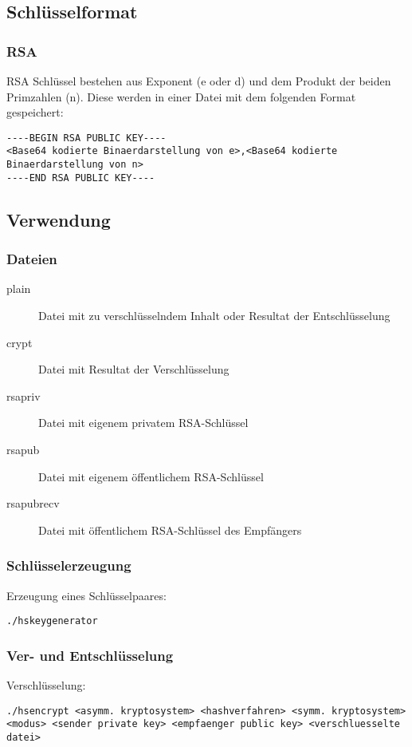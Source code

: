 \documentclass[11pt,a4paper,parskip=half]{scrartcl}
\begin{document}
\subsection{Schlüsselformat}
\subsubsection{RSA}
RSA Schlüssel bestehen aus Exponent (e oder d) und dem Produkt der beiden Primzahlen (n). Diese werden in einer Datei mit dem folgenden Format gespeichert:
\begin{lstlisting}
----BEGIN RSA PUBLIC KEY----
<Base64 kodierte Binaerdarstellung von e>,<Base64 kodierte Binaerdarstellung von n>
----END RSA PUBLIC KEY----
\end{lstlisting}

\subsection{Verwendung}
\subsubsection{Dateien}
\begin{description}
	\item[plain] Datei mit zu verschlüsselndem Inhalt oder Resultat der Entschlüsselung
	\item[crypt] Datei mit Resultat der Verschlüsselung
	\item[rsapriv] Datei mit eigenem privatem RSA-Schlüssel
	\item[rsapub] Datei mit eigenem öffentlichem RSA-Schlüssel
	\item[rsapubrecv] Datei mit öffentlichem RSA-Schlüssel des Empfängers
\end{description}

\subsubsection{Schlüsselerzeugung}
Erzeugung eines Schlüsselpaares:
\begin{lstlisting}
./hskeygenerator
\end{lstlisting}

\subsubsection{Ver- und Entschlüsselung}
Verschlüsselung:
\begin{lstlisting}
./hsencrypt <asymm. kryptosystem> <hashverfahren> <symm. kryptosystem> <modus> <sender private key> <empfaenger public key> <verschluesselte datei>
\end{lstlisting}
\end{document}
